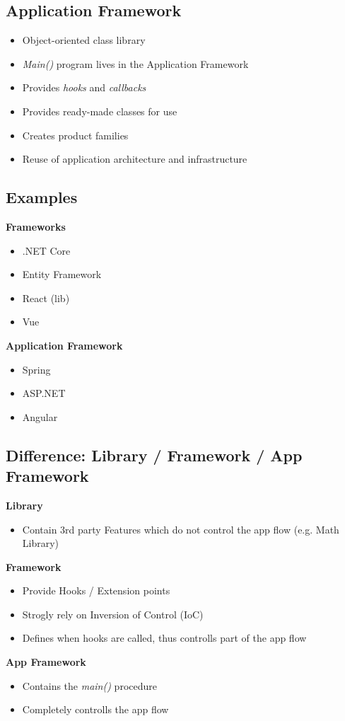 \subsection{Application Framework}
\begin{itemize}
    \item Object-oriented class library
    \item \textit{Main()} program lives in the Application Framework
    \item Provides \textit{hooks} and \textit{callbacks}
    \item Provides ready-made classes for use
    \item Creates product families
    \item Reuse of application architecture and infrastructure
\end{itemize}
\subsection{Examples}
\textbf{Frameworks}
\begin{itemize}
    \item .NET Core
    \item Entity Framework
    \item React (lib)
    \item Vue
\end{itemize}
\textbf{Application Framework}
\begin{itemize}
    \item Spring
    \item ASP.NET
    \item Angular
\end{itemize}

\subsection{Difference: Library / Framework / App Framework}
\textbf{Library}
\begin{itemize}
    \item Contain 3rd party Features which do not control the app flow (e.g. Math Library)
\end{itemize}
\textbf{Framework}
\begin{itemize}
    \item Provide Hooks / Extension points
    \item Strogly rely on Inversion of Control (IoC)
    \item Defines when hooks are called, thus controlls part of the app flow
\end{itemize}
\textbf{App Framework}
\begin{itemize}
    \item Contains the \textit{main()} procedure
    \item Completely controlls the app flow
\end{itemize}

